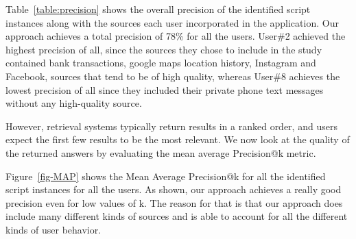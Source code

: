 \documentclass[11pt]{article}
\begin{document}
Table~\ref{table:precision} shows the overall precision of the identified script instances along with the sources each user incorporated in the application. Our approach achieves a total precision of  78\% for all the users. User\#2 achieved the highest precision of all, since the sources they chose to include in the study contained bank transactions, google maps location history, Instagram and Facebook, sources that tend to be of high quality, whereas User\#8 achieves the lowest precision of all since they included their private phone text messages without any high-quality source. 

However, retrieval systems typically return results in a ranked order, and users expect the first few results to be the most relevant.  We now look at the quality of the returned answers by evaluating the mean average Precision@k metric. 

Figure~\ref{fig-MAP} shows the Mean Average Precision@k for all the identified script instances for all the users. As shown, our approach achieves a really good precision even for low values of k. The reason for that is that our approach does include many different kinds of sources and is able to account for all the different kinds of user behavior. 
\end{document}
